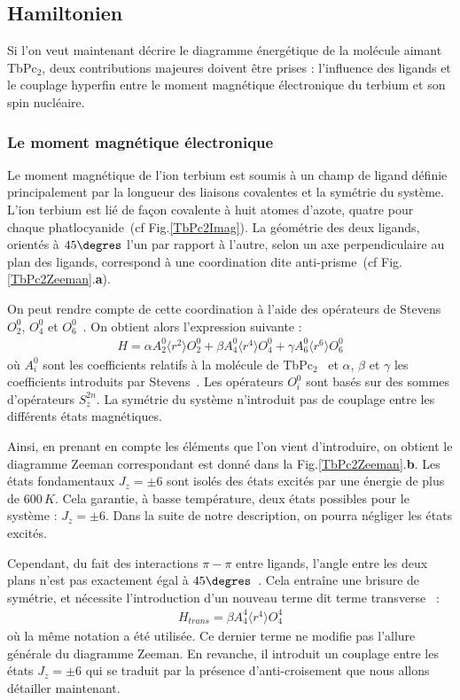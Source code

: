 \subsection{Hamiltonien}

Si l'on veut maintenant décrire le diagramme énergétique de la molécule aimant TbPc$_{2}$, deux contributions majeures doivent être prises : l'influence des ligands et le couplage hyperfin entre le moment magnétique électronique du terbium et son spin nucléaire.

\subsubsection{Le moment magnétique électronique}
Le moment magnétique de l'ion terbium est soumis à un champ de ligand définie principalement par la longueur des liaisons covalentes et la symétrie du système. 
L'ion terbium est lié de façon covalente à huit atomes d'azote, quatre pour chaque phatlocyanide~(cf Fig.\ref{TbPc2Imag}). La géométrie des deux ligands, orientés à $45\degres$ l'un par rapport à l'autre, selon un axe perpendiculaire au plan des ligands, correspond à une coordination dite anti-prisme~(cf Fig.\ref{TbPc2Zeeman}.\textbf{a}). 

On peut rendre compte de cette coordination à l'aide des opérateurs de Stevens $O_2^0$, $O_4^0$ et $O_6^0$~\cite{Stevens1952,Sorace2011}. On obtient alors l'expression suivante :
\begin{eqnarray}
H = \alpha A_2^0 \langle r^2 \rangle O_2^0 + \beta A_4^0 \langle r^4 \rangle O_4^0 + \gamma A_6^0 \langle r^6 \rangle O_6^0
\end{eqnarray}
où $A_i^0$ sont les coefficients relatifs à la molécule de TbPc$_2$~\cite{Ishikawa2005} et $\alpha$, $\beta$ et $\gamma$ les coefficients introduits par Stevens~\cite{Stevens1952}. Les opérateurs $O^0_i$ sont basés sur des sommes d'opérateurs $S_z^{2n}$. La symétrie du système n'introduit pas de couplage entre les différents états magnétiques. 

Ainsi, en prenant en compte les éléments que l'on vient d'introduire, on obtient le diagramme Zeeman correspondant est donné dans la Fig.\ref{TbPc2Zeeman}.\textbf{b}. Les états fondamentaux $J_z = \pm 6$ sont isolés des états excités par une énergie de plus de $600\,K$. Cela garantie, à basse température, deux états possibles pour le système : $J_z = \pm 6$. Dans la suite de notre description, on pourra négliger les états excités.

 
Cependant, du fait des interactions $\pi - \pi$ entre ligands, l'angle entre les deux plans n'est pas exactement égal à $45\degres$~\cite{Koike1996}. Cela entraîne une brisure de symétrie, et nécessite l'introduction d'un nouveau terme dit terme transverse~\cite{Sorace2011} :
\begin{eqnarray}
H_{trans} = \beta A_4^4 \langle r^4 \rangle O_4^4
\end{eqnarray}
où la m\^eme notation a été utilisée. Ce dernier terme ne modifie pas l'allure générale du diagramme Zeeman. En revanche, il introduit un couplage entre les états  $J_z = \pm 6$ qui se traduit par la présence d'anti-croisement que nous allons détailler maintenant.

